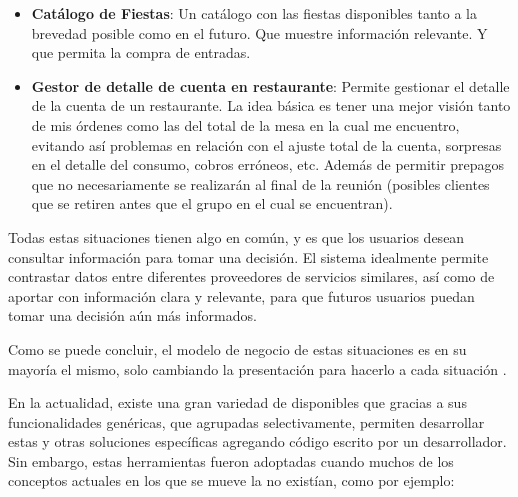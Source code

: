 \begin{itemize}
			
			\item
				\textbf{Catálogo de Fiestas}: Un catálogo con las fiestas disponibles tanto a la brevedad posible como en el futuro. Que muestre información relevante. Y que permita la compra de entradas.
			
			\item
				\textbf{Gestor de detalle de cuenta en restaurante}: Permite gestionar el detalle de la cuenta de un restaurante. La idea básica es tener una mejor visión tanto de mis órdenes como las del total de la mesa en la cual me encuentro, evitando así problemas en relación con el ajuste total de la cuenta, sorpresas en el detalle del consumo, cobros erróneos, etc. Además de permitir prepagos que no necesariamente se realizarán al final de la reunión (posibles clientes que se retiren antes que el grupo en el cual se encuentran).
			
		\end{itemize}

		Todas estas situaciones tienen algo en común, y es que los usuarios desean consultar información para tomar una decisión. El sistema idealmente permite contrastar datos entre diferentes proveedores de servicios similares, así como de aportar con información clara y relevante, para que futuros usuarios puedan tomar una decisión aún más informados.

				Como se puede concluir, el modelo de negocio de estas situaciones es en su mayoría el mismo, solo cambiando la presentación para hacerlo \adhoc a cada situación \citeAllFrameworks.

		En la actualidad, existe una gran variedad de \frameworksPC disponibles que gracias a sus funcionalidades genéricas, que agrupadas selectivamente, permiten  desarrollar estas y otras soluciones específicas agregando código escrito por un desarrollador. Sin embargo, estas herramientas fueron adoptadas cuando muchos de los conceptos actuales en los que se mueve la \internetINT no existían, como por ejemplo:


